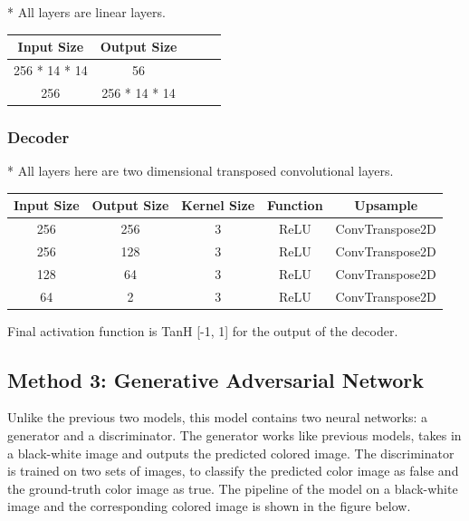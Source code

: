 \documentclass{article}
\begin{document}
* All layers are linear layers.

\begin{center}
\begin{tabular}{ |c|c|c|c|c| } 
\hline
Input Size & Output Size  \\
\hline
256 * 14 * 14 & 56 \\ 
256 & 256 * 14 * 14 \\ 

\hline
\end{tabular}
\end{center}

\subsubsection{Decoder}

* All layers here are two dimensional transposed convolutional layers.

\begin{center}
\begin{tabular}{ |c|c|c|c|c| } 
\hline
Input Size & Output Size & Kernel Size & Function & Upsample \\
\hline
256 & 256 & 3 & ReLU & ConvTranspose2D \\ 
256 & 128 & 3 & ReLU & ConvTranspose2D \\ 
128 & 64 & 3 & ReLU &  ConvTranspose2D \\ 
64 & 2 & 3 & ReLU & ConvTranspose2D \\ 
\hline
\end{tabular}
\end{center}

Final activation function is TanH [-1, 1] for the output of the decoder.


\subsection{Method 3: Generative Adversarial Network}
Unlike the previous two models, this model contains two neural networks: a generator and a discriminator. 
The generator works like previous models, takes in a black-white image and outputs the predicted colored image.
The discriminator is trained on two sets of images, to classify the predicted color image as false and the ground-truth color image as true. 
The pipeline of the model on a black-white image and the corresponding colored image is shown in the figure below.
\end{document}
